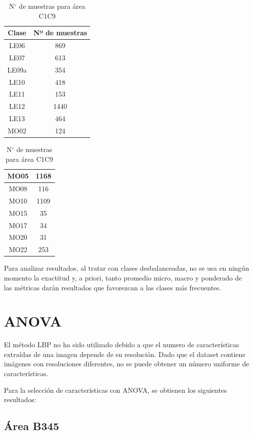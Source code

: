 \begin{table}[H]
	\centering
	\begin{tabular}{|c|c|}
		\hline
		Clase & Nº de muestras \\ \hline
		LE06 & 869 \\ \hline
		LE07 & 613 \\ \hline
		LE09a & 354 \\ \hline
		LE10 & 418 \\ \hline
		LE11 & 153 \\ \hline
		LE12 & 1440 \\ \hline
		LE13 & 464 \\ \hline
		MO02 & 124 \\ \hline
	\end{tabular}
	\begin{tabular}{|c|c|}
		\hline	
		MO05 & 1168 \\ \hline
		MO08 & 116 \\ \hline
		MO10 & 1109 \\ \hline
		MO15 & 35 \\ \hline
		MO17 & 34 \\ \hline
		MO20 & 31 \\ \hline
		MO22 & 253 \\ \hline
	\end{tabular}
	\caption{N$^\circ$ de muestras para área C1C9}	
	\label{tab:n_muestras_c1c9}
\end{table}

Para analizar resultados, al tratar con clases desbalanceadas, no se usa en ningún momento la exactitud y, a priori, tanto promedio micro, macro y ponderado de las métricas darán resultados que favorezcan a las clases más frecuentes.

\section{ANOVA}

El método LBP no ha sido utilizado debido a que el numero de características extraídas de una imagen depende de su resolución. Dado que el dataset contiene imágenes con resoluciones diferentes, no se puede obtener un número uniforme de características.

Para la selección de características con ANOVA, se obtienen los siguientes resultados:

\subsection{Área B345}


